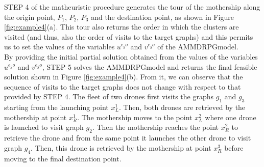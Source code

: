 \documentclass[10pt,a4paper]{elsarticle}
\def\AMD{{\sf AMMDRPG\xspace}}
\newcommand{\EN}[1]{{\color{black}#1}}
\begin{document}
\noindent
STEP 4 of the matheuristic procedure generates the tour of the mothership along the origin point, $P_1$, $P_2$, $P_3$ and the destination point, as shown in Figure \ref{fig:example4}(a). This tour \EN{also returns} the order in which the clusters are visited (and thus, also the order of visits to the target graphs) and this permits \EN{us} to set the values of the variables $u^{e_{g}o}$ and $v^{e_{g}o}$ of the \AMD\space model.\\
\noindent 
By providing the initial partial solution obtained \EN{from} the values of the variables $u^{e_{g}o}$ and $v^{e_{g}o}$, STEP 5 solves the \AMD\space model and returns the final feasible solution shown in Figure \ref{fig:example4}(b). From it, we can observe that the sequence of visits \EN{to} the target graphs does not change with respect to \EN{that} provided by STEP 4. The fleet of two drones first visits the graphs $g_1$ and $g_3$ starting from the launching point $x^1_L$. Then, both drones are retrieved by the mothership at point $x^1_R$. The mothership moves to the point $x^2_L$  where one drone is launched \EN{to visit} graph $g_2$. Then the mothership reaches the point $x^2_R$ to retrieve the drone and from the same point it launches the other drone \EN{to visit} graph $g_4$. Then, this drone is retrieved by the mothership at point $x^3_R$ before moving to the final destination point.
\end{document}

